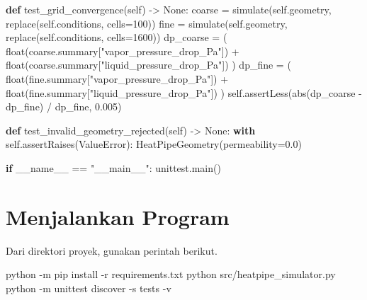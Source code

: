 \documentclass[
  12pt,
  12pt,a4paper,oneside]{report}
\newenvironment{Shaded}{}{}
\newcommand{\AttributeTok}[1]{\textcolor[rgb]{0.49,0.56,0.16}{#1}}
\newcommand{\BuiltInTok}[1]{\textcolor[rgb]{0.00,0.50,0.00}{#1}}
\newcommand{\ControlFlowTok}[1]{\textcolor[rgb]{0.00,0.44,0.13}{\textbf{#1}}}
\newcommand{\DecValTok}[1]{\textcolor[rgb]{0.25,0.63,0.44}{#1}}
\newcommand{\ExtensionTok}[1]{#1}
\newcommand{\FloatTok}[1]{\textcolor[rgb]{0.25,0.63,0.44}{#1}}
\newcommand{\KeywordTok}[1]{\textcolor[rgb]{0.00,0.44,0.13}{\textbf{#1}}}
\newcommand{\NormalTok}[1]{#1}
\newcommand{\OperatorTok}[1]{\textcolor[rgb]{0.40,0.40,0.40}{#1}}
\newcommand{\PreprocessorTok}[1]{\textcolor[rgb]{0.74,0.48,0.00}{#1}}
\newcommand{\StringTok}[1]{\textcolor[rgb]{0.25,0.44,0.63}{#1}}
\newcommand{\VariableTok}[1]{\textcolor[rgb]{0.10,0.09,0.49}{#1}}
\begin{document}
\begin{Shaded}
\begin{Highlighting}[]
    \KeywordTok{def}\NormalTok{ test\_grid\_convergence(}\VariableTok{self}\NormalTok{) }\OperatorTok{{-}\textgreater{}} \VariableTok{None}\NormalTok{:}
\NormalTok{        coarse }\OperatorTok{=}\NormalTok{ simulate(}\VariableTok{self}\NormalTok{.geometry, replace(}\VariableTok{self}\NormalTok{.conditions, cells}\OperatorTok{=}\DecValTok{100}\NormalTok{))}
\NormalTok{        fine }\OperatorTok{=}\NormalTok{ simulate(}\VariableTok{self}\NormalTok{.geometry, replace(}\VariableTok{self}\NormalTok{.conditions, cells}\OperatorTok{=}\DecValTok{1600}\NormalTok{))}
\NormalTok{        dp\_coarse }\OperatorTok{=}\NormalTok{ (}
            \BuiltInTok{float}\NormalTok{(coarse.summary[}\StringTok{"vapor\_pressure\_drop\_Pa"}\NormalTok{])}
            \OperatorTok{+} \BuiltInTok{float}\NormalTok{(coarse.summary[}\StringTok{"liquid\_pressure\_drop\_Pa"}\NormalTok{])}
\NormalTok{        )}
\NormalTok{        dp\_fine }\OperatorTok{=}\NormalTok{ (}
            \BuiltInTok{float}\NormalTok{(fine.summary[}\StringTok{"vapor\_pressure\_drop\_Pa"}\NormalTok{])}
            \OperatorTok{+} \BuiltInTok{float}\NormalTok{(fine.summary[}\StringTok{"liquid\_pressure\_drop\_Pa"}\NormalTok{])}
\NormalTok{        )}
        \VariableTok{self}\NormalTok{.assertLess(}\BuiltInTok{abs}\NormalTok{(dp\_coarse }\OperatorTok{{-}}\NormalTok{ dp\_fine) }\OperatorTok{/}\NormalTok{ dp\_fine, }\FloatTok{0.005}\NormalTok{)}

    \KeywordTok{def}\NormalTok{ test\_invalid\_geometry\_rejected(}\VariableTok{self}\NormalTok{) }\OperatorTok{{-}\textgreater{}} \VariableTok{None}\NormalTok{:}
        \ControlFlowTok{with} \VariableTok{self}\NormalTok{.assertRaises(}\PreprocessorTok{ValueError}\NormalTok{):}
\NormalTok{            HeatPipeGeometry(permeability}\OperatorTok{=}\FloatTok{0.0}\NormalTok{)}


\ControlFlowTok{if} \VariableTok{\_\_name\_\_} \OperatorTok{==} \StringTok{"\_\_main\_\_"}\NormalTok{:}
\NormalTok{    unittest.main()}
\end{Highlighting}
\end{Shaded}

\hypertarget{menjalankan-program}{%
\section{Menjalankan Program}\label{menjalankan-program}}

Dari direktori proyek, gunakan perintah berikut.

\begin{Shaded}
\begin{Highlighting}[]
\ExtensionTok{python} \AttributeTok{{-}m}\NormalTok{ pip install }\AttributeTok{{-}r}\NormalTok{ requirements.txt}
\ExtensionTok{python}\NormalTok{ src/heatpipe\_simulator.py}
\ExtensionTok{python} \AttributeTok{{-}m}\NormalTok{ unittest discover }\AttributeTok{{-}s}\NormalTok{ tests }\AttributeTok{{-}v}
\end{Highlighting}
\end{Shaded}
\end{document}
